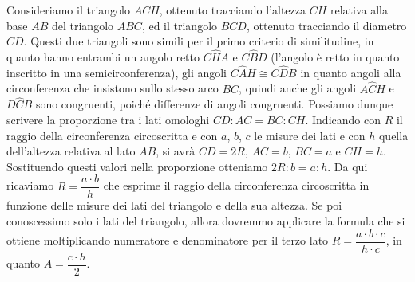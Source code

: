 Consideriamo il triangolo $ACH$, ottenuto tracciando l'altezza $CH$ relativa alla base $AB$ del triangolo $ABC$, ed il triangolo $BCD$, ottenuto tracciando il diametro $CD$. Questi due triangoli sono simili per il primo criterio di similitudine, in quanto hanno entrambi un angolo retto $C\widehat{H}A$ e $C\widehat{B}D$ (l'angolo è retto in quanto inscritto in una semicirconferenza), gli angoli $C\widehat{A}H\cong C\widehat{D}B$ in quanto angoli alla circonferenza che insistono sullo stesso arco $BC$, quindi anche gli angoli $A\widehat{C}H$ e $D\widehat{C}B$ sono congruenti, poiché differenze di angoli congruenti. Possiamo dunque scrivere la proporzione tra i lati omologhi $CD:AC=BC:CH$.
Indicando con $R$ il raggio della circonferenza circoscritta e con $a$, $b$, $c$ le misure dei lati e con $h$ quella dell'altezza relativa al lato $AB$, si avrà $CD=2R$, $AC=b$, $BC=a$ e $CH=h$. Sostituendo questi valori nella proporzione otteniamo $2R : b = a : h$.
Da qui ricaviamo $R=\dfrac{a\cdot b}{h}$ che esprime il raggio della circonferenza circoscritta in funzione delle misure dei lati del triangolo e della sua altezza. Se poi conoscessimo solo i lati del triangolo, allora dovremmo applicare la formula che si ottiene moltiplicando numeratore e denominatore per il terzo lato $R=\dfrac{a\cdot b\cdot c}{h\cdot c}$, in quanto $A=\dfrac{c\cdot h}{2}$.


\newpage



\cleardoublepage
